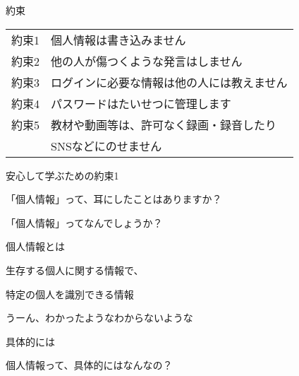 \documentclass[
  ignorenonframetext,
  aspectratio=169,
  xcolor=dvipsnames]{beamer}
\begin{document}
\begin{frame}{約束}
\label{ux7d04ux675f-1}
\Large

\begin{tabular}{ll}
約束1& 個人情報は書き込みません\\\pause
約束2& 他の人が傷つくような発言はしません\\\pause
約束3& ログインに必要な情報は他の人には教えません\\\pause
約束4& パスワードはたいせつに管理します\\\pause
約束5& 教材や動画等は、許可なく録画・録音したり\\
&      SNSなどにのせません
\end{tabular}
\end{frame}

\begin{frame}{安心して学ぶための約束1}
\label{ux5b89ux5fc3ux3057ux3066ux5b66ux3076ux305fux3081ux306eux7d04ux675f1}
\LARGE

\pause

「個人情報」って、耳にしたことはありますか？

\pause

「個人情報」ってなんでしょうか？
\end{frame}

\begin{frame}{個人情報とは}
\label{ux500bux4ebaux60c5ux5831ux3068ux306f}
\LARGE

生存する個人に関する情報で、

特定の個人を識別できる情報

\vfill
\pause

うーん、わかったようなわからないような
\end{frame}

\begin{frame}{具体的には}
\label{ux5177ux4f53ux7684ux306bux306f}
\LARGE

個人情報って、具体的にはなんなの？
\end{frame}
\end{document}
